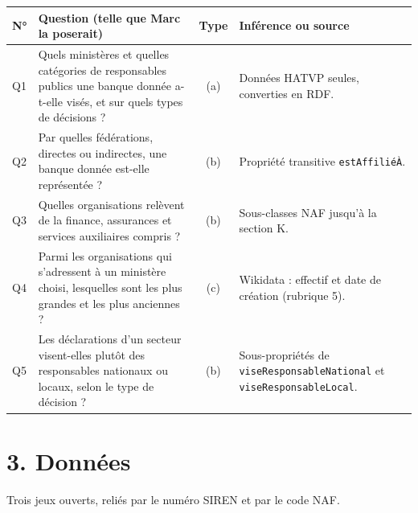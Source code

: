 \documentclass[11pt,a4paper]{article}
\begin{document}
\medskip
{\small
\begin{tabularx}{\linewidth}{@{}l Y c Y@{}}
  \toprule
  \textbf{N°} & \textbf{Question (telle que Marc la poserait)} & \textbf{Type} & \textbf{Inférence ou source}\\
  \midrule
  Q1 & Quels ministères et quelles catégories de responsables publics une banque donnée a-t-elle visés, et sur quels types de décisions ? & (a) & Données HATVP seules, converties en RDF.\\
  Q2 & Par quelles fédérations, directes ou indirectes, une banque donnée est-elle représentée ? & (b) & Propriété transitive \texttt{estAffiliéÀ}.\\
  Q3 & Quelles organisations relèvent de la finance, assurances et services auxiliaires compris ? & (b) & Sous-classes NAF jusqu'à la section K.\\
  Q4 & Parmi les organisations qui s'adressent à un ministère choisi, lesquelles sont les plus grandes et les plus anciennes ? & (c) & Wikidata : effectif et date de création (rubrique 5).\\
  Q5 & Les déclarations d'un secteur visent-elles plutôt des responsables nationaux ou locaux, selon le type de décision ? & (b) & Sous-propriétés de \texttt{viseResponsableNational} et \texttt{viseResponsableLocal}.\\
  \bottomrule
\end{tabularx}}

\section*{3. Données}

Trois jeux ouverts, reliés par le numéro SIREN et par le code NAF.
\end{document}
